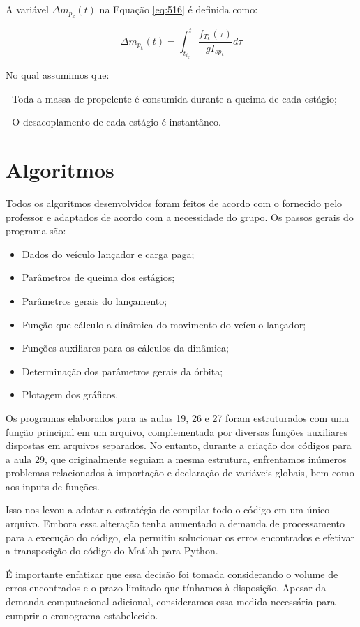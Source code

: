 A variável $\Delta m_{p_{k}}(t)$ na Equação \ref{eq:516} é definida como:

\begin{equation}
\Delta m_{p_{k}}(t) = \int_{t_{i_{k}}}^{t} \frac{f_{T_{k}}(\tau)}{g I_{sp_{k}}} d \tau
\end{equation}

No qual assumimos que:

\par - Toda a massa de propelente é consumida durante a queima de cada estágio;
\par - O desacoplamento de cada estágio é instantâneo.

\section{Algoritmos}

Todos os algoritmos desenvolvidos foram feitos de acordo com o fornecido pelo professor e adaptados de acordo com a necessidade do grupo. Os passos gerais do programa são:

\begin{itemize}
    
    \item Dados do veículo lançador e carga paga;

    \item Parâmetros de queima dos estágios;

    \item Parâmetros gerais do lançamento;

    \item Função que cálculo a dinâmica do movimento do veículo lançador;

    \item Funções auxiliares para os cálculos da dinâmica;

    \item Determinação dos parâmetros gerais da órbita;

    \item Plotagem dos gráficos.
    
\end{itemize}

Os programas elaborados para as aulas 19, 26 e 27 foram estruturados com uma função principal em um arquivo, complementada por diversas funções auxiliares dispostas em arquivos separados. No entanto, durante a criação dos códigos para a aula 29, que originalmente seguiam a mesma estrutura, enfrentamos inúmeros problemas relacionados à importação e declaração de variáveis globais, bem como aos inputs de funções.

Isso nos levou a adotar a estratégia de compilar todo o código em um único arquivo. Embora essa alteração tenha aumentado a demanda de processamento para a execução do código, ela permitiu solucionar os erros encontrados e efetivar a transposição do código do Matlab para Python.

É importante enfatizar que essa decisão foi tomada considerando o volume de erros encontrados e o prazo limitado que tínhamos à disposição. Apesar da demanda computacional adicional, consideramos essa medida necessária para cumprir o cronograma estabelecido.